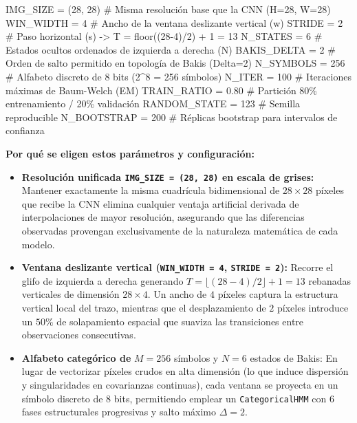 \documentclass[
  spanish,
  us-letterpaper,
]{scrreprt}
\newenvironment{Shaded}{\begin{snugshade}}{\end{snugshade}}
\newcommand{\CommentTok}[1]{\textcolor[rgb]{0.37,0.37,0.37}{#1}}
\newcommand{\DecValTok}[1]{\textcolor[rgb]{0.68,0.00,0.00}{#1}}
\newcommand{\FloatTok}[1]{\textcolor[rgb]{0.68,0.00,0.00}{#1}}
\newcommand{\NormalTok}[1]{\textcolor[rgb]{0.00,0.23,0.31}{#1}}
\newcommand{\OperatorTok}[1]{\textcolor[rgb]{0.37,0.37,0.37}{#1}}
\providecommand{\tightlist}{%
  \setlength{\itemsep}{0pt}\setlength{\parskip}{0pt}}
\theoremstyle{definition}
\theoremstyle{remark}
\begin{document}
\begin{Shaded}
\begin{Highlighting}[]
\NormalTok{IMG\_SIZE }\OperatorTok{=}\NormalTok{ (}\DecValTok{28}\NormalTok{, }\DecValTok{28}\NormalTok{)       }\CommentTok{\# Misma resolución base que la CNN (H=28, W=28)}
\NormalTok{WIN\_WIDTH }\OperatorTok{=} \DecValTok{4}             \CommentTok{\# Ancho de la ventana deslizante vertical (w)}
\NormalTok{STRIDE }\OperatorTok{=} \DecValTok{2}                \CommentTok{\# Paso horizontal (s) {-}\textgreater{} T = floor((28{-}4)/2) + 1 = 13}
\NormalTok{N\_STATES }\OperatorTok{=} \DecValTok{6}              \CommentTok{\# Estados ocultos ordenados de izquierda a derecha (N)}
\NormalTok{BAKIS\_DELTA }\OperatorTok{=} \DecValTok{2}           \CommentTok{\# Orden de salto permitido en topología de Bakis (Delta=2)}
\NormalTok{N\_SYMBOLS }\OperatorTok{=} \DecValTok{256}           \CommentTok{\# Alfabeto discreto de 8 bits (2\^{}8 = 256 símbolos)}
\NormalTok{N\_ITER }\OperatorTok{=} \DecValTok{100}              \CommentTok{\# Iteraciones máximas de Baum{-}Welch (EM)}
\NormalTok{TRAIN\_RATIO }\OperatorTok{=} \FloatTok{0.80}        \CommentTok{\# Partición 80\% entrenamiento / 20\% validación}
\NormalTok{RANDOM\_STATE }\OperatorTok{=} \DecValTok{123}        \CommentTok{\# Semilla reproducible}
\NormalTok{N\_BOOTSTRAP }\OperatorTok{=} \DecValTok{200}         \CommentTok{\# Réplicas bootstrap para intervalos de confianza}
\end{Highlighting}
\end{Shaded}

\textbf{Por qué se eligen estos parámetros y configuración:}

\begin{itemize}
\tightlist
\item
  \textbf{Resolución unificada \texttt{IMG\_SIZE\ =\ (28,\ 28)} en
  escala de grises:} Mantener exactamente la misma cuadrícula
  bidimensional de \(28 \times 28\) píxeles que recibe la CNN elimina
  cualquier ventaja artificial derivada de interpolaciones de mayor
  resolución, asegurando que las diferencias observadas provengan
  exclusivamente de la naturaleza matemática de cada modelo.
\item
  \textbf{Ventana deslizante vertical (\texttt{WIN\_WIDTH\ =\ 4},
  \texttt{STRIDE\ =\ 2}):} Recorre el glifo de izquierda a derecha
  generando \(T = \lfloor (28 - 4)/2 \rfloor + 1 = 13\) rebanadas
  verticales de dimensión \(28 \times 4\). Un ancho de \(4\) píxeles
  captura la estructura vertical local del trazo, mientras que el
  desplazamiento de \(2\) píxeles introduce un \(50\%\) de solapamiento
  espacial que suaviza las transiciones entre observaciones
  consecutivas.
\item
  \textbf{Alfabeto categórico de} \(M = 256\) símbolos y \(N = 6\)
  estados de Bakis: En lugar de vectorizar píxeles crudos en alta
  dimensión (lo que induce dispersión y singularidades en covarianzas
  continuas), cada ventana se proyecta en un símbolo discreto de \(8\)
  bits, permitiendo emplear un \texttt{CategoricalHMM} con \(6\) fases
  estructurales progresivas y salto máximo \(\Delta = 2\).
\end{itemize}
\end{document}
